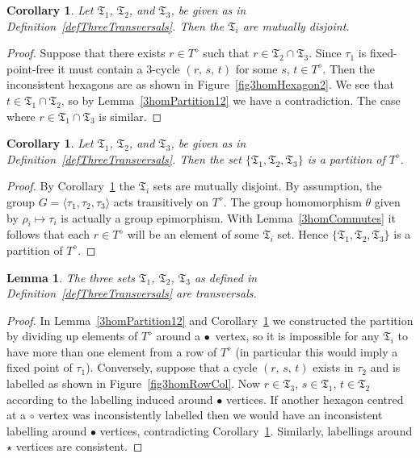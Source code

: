 \documentclass[amstags,fleqn,reqno]{article}
\theoremstyle{plain}
\newtheorem{lemma}[theorem]{Lemma}
\newtheorem{corollary}[theorem]{Corollary}
\theoremstyle{definition}
\newcommand{\fpf}{fixed-point-free\xspace}
\newcommand{\opa}{\diamond}
\newcommand{\blackvertex}{\bullet}
\newcommand{\whitevertex}{\circ}
\newcommand{\starvertex}{\star}
\newcommand{\transversal}{\mathfrak{T}}
\begin{document}
\begin{corollary}\label{3homPartition123}
Let $\transversal_1$, $\transversal_2$, and $\transversal_3$, be given as in
Definition~\ref{defThreeTransversals}. Then the $\transversal_i$ are
mutually disjoint.
\end{corollary}

\begin{proof}
Suppose that there exists $r \in T^{\opa}$ such that 
$r \in \transversal_2 \cap \transversal_3$. Since $\tau_1$ is \fpf it
must contain a $3$-cycle $(r,\, s,\, t)$ for some $s$, $t \in T^{\opa}$.
Then the inconsistent
hexagons are as shown in Figure~\ref{fig3homHexagon2}. 
We see that $t \in \transversal_1 \cap \transversal_2$, so by
Lemma~\ref{3homPartition12} we have a contradiction. The case where
$r \in \transversal_1 \cap \transversal_3$ is similar.
\end{proof}

\begin{corollary}\label{corPartition}
Let $\transversal_1$, $\transversal_2$, and $\transversal_3$, be given as in
Definition~\ref{defThreeTransversals}. Then the set $\{ \transversal_1,
\transversal_2, \transversal_3 \}$ is a partition of $T^{\opa}$.  
\end{corollary}

\begin{proof}
By Corollary~\ref{3homPartition123} the $\transversal_i$ sets are
mutually disjoint.
By assumption, the group $G = \langle \tau_1, \tau_2, \tau_3 \rangle$ acts transitively
on $T^{\opa}$. The group homomorphism $\theta$ given by
$\rho_i \mapsto \tau_i$ is actually a group epimorphism. With Lemma~\ref{3homCommutes}
it follows that each $r \in T^{\opa}$ will be an element of some
$\transversal_i$ set. Hence 
$\{ \transversal_1, \transversal_2, \transversal_3 \}$ is a partition of
$T^{\opa}$.
\end{proof}

\begin{lemma}\label{3homTransversal}
The three sets $\transversal_1$, $\transversal_2$, $\transversal_3$ as defined in
Definition~\ref{defThreeTransversals} are transversals.
\end{lemma}

\begin{proof}
In
Lemma~\ref{3homPartition12} and
Corollary~\ref{corPartition} we constructed the partition
by dividing up elements of $T^{\opa}$ around a $\blackvertex$~vertex, so
it is impossible for any
$\transversal_i$ to have more than one element from a row of $T^{\opa}$
(in particular this would imply a fixed point of $\tau_1$).
Conversely, suppose that a cycle $(r,\, s,\, t)$ exists in $\tau_2$ and is
labelled as shown in Figure~\ref{fig3homRowCol}.
Now $r \in \transversal_3$, $s \in \transversal_1$, $t \in \transversal_2$ according to the labelling
induced around $\blackvertex$ vertices. If another hexagon centred at a
$\whitevertex$ vertex was inconsistently labelled then we would have an
inconsistent labelling around $\blackvertex$ vertices, contradicting
Corollary~\ref{corPartition}. Similarly, labellings around $\starvertex$ vertices
are consistent.
\end{proof}
\end{document}
